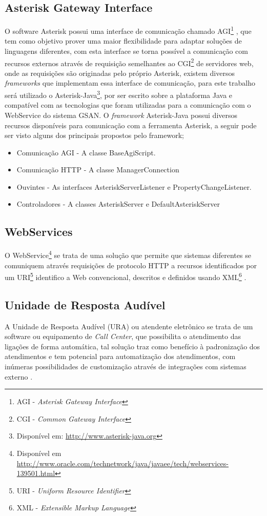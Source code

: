 \subsection{Asterisk Gateway Interface}
O software Asterisk possui uma interface de comunicação chamado AGI\footnote{AGI - \textit{Asterisk Gateway Interface}} \cite{asteriskAgi}, que tem como objetivo prover uma maior flexibilidade para adaptar soluções de linguagens diferentes, com esta interface se torna possível a comunicação com recursos externos através de requisição semelhantes ao CGI\footnote{CGI - \textit{Common Gateway Interface}} de servidores web, onde as requisições são originadas pelo próprio Asterisk, existem diversos \textit{frameworks} que implementam essa interface de comunicação, para este trabalho será utilizado o Asterisk-Java\footnote{Disponível em: \url{http://www.asterisk-java.org}}\label{key:asteriskjava}, por ser escrito sobre a plataforma Java e compatível com as tecnologias que foram utilizadas para a comunicação com o WebService do sistema GSAN.
O \textit{framework} Asterisk-Java possui diversos recursos disponíveis para comunicação com a ferramenta Asterisk, a seguir pode ser visto alguns dos principais propostos pelo framework;

\begin{itemize}
	\item Comunicação AGI - A classe BaseAgiScript.
	\item Comunicação HTTP - A classe ManagerConnection
	\item Ouvintes - As interfaces AsteriskServerListener e PropertyChangeListener.
	\item Controladores - A classes AsteriskServer e DefaultAsteriskServer
\end{itemize}


\subsection{WebServices}
O WebService\footnote{Disponível em \url{http://www.oracle.com/technetwork/java/javaee/tech/webservices-139501.html}} se trata de uma solução que permite que sistemas diferentes se comuniquem através requisições de protocolo HTTP a recursos identificados por um URI\footnote{URI - \textit{Uniform Resource Identifier}}  identifico a Web convencional, descritos e definidos usando XML\footnote{XML - \textit{Extensible Markup Language}} .

\subsection{Unidade de Resposta Audível}
A Unidade de Resposta Audível\label{key:URA} (URA) ou atendente eletrônico se trata de um software ou equipamento de \textit{Call Center}, que possibilita o atendimento das ligações de forma automática, tal solução traz como benefício à padronização dos atendimentos e tem potencial para automatização dos atendimentos, com inúmeras possibilidades de customização através de integrações com sistemas externo \cite{VIEIRA:2007}.

